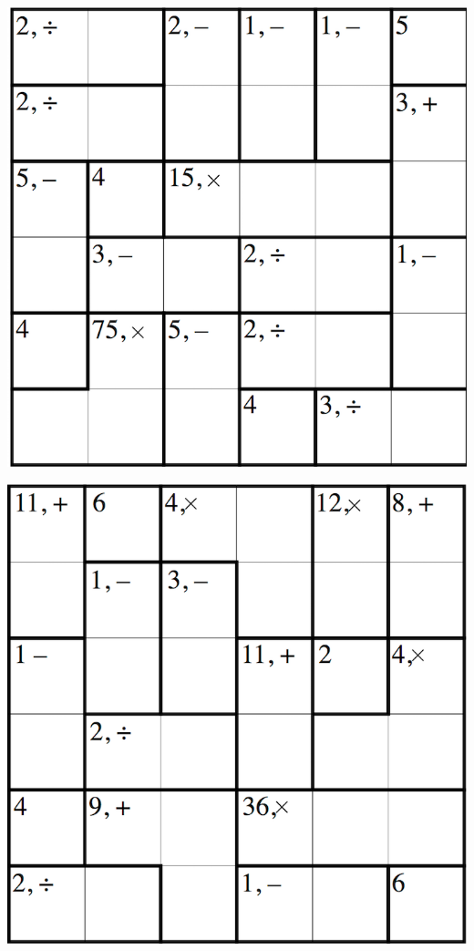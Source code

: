 
\includegraphics[scale=1]{Gambar/Lampiran/6x6_3.png}

\includegraphics[scale=1]{Gambar/Lampiran/6x6_4.png}
